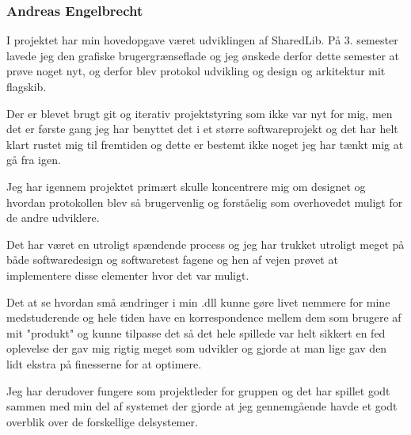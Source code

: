 \subsubsection{Andreas Engelbrecht}
I projektet har min hovedopgave været udviklingen af SharedLib. 
På 3. semester lavede jeg den grafiske brugergrænseflade og jeg ønskede derfor dette semester at prøve noget nyt, og derfor blev protokol udvikling og design og arkitektur mit flagskib.

Der er blevet brugt git og iterativ projektstyring som ikke var nyt for mig, men det er første gang jeg har benyttet det i et større softwareprojekt og det har helt klart rustet mig til fremtiden og dette er bestemt ikke noget jeg har tænkt mig at gå fra igen.

Jeg har igennem projektet primært skulle koncentrere mig om designet og hvordan protokollen blev så brugervenlig og forståelig som overhovedet muligt for de andre udviklere.

Det har været en utroligt spændende process og jeg har trukket utroligt meget på både softwaredesign og softwaretest fagene og hen af vejen prøvet at implementere disse elementer hvor det var muligt. 

Det at se hvordan små ændringer i min .dll kunne gøre livet nemmere for mine medstuderende og hele tiden have en korrespondence mellem dem som brugere af mit "produkt" og kunne tilpasse det så det hele spillede var helt sikkert en fed oplevelse der gav mig rigtig meget som udvikler og gjorde at man lige gav den lidt ekstra på finesserne for at optimere.  

Jeg har derudover fungere som projektleder for gruppen og det har spillet godt sammen med min del af systemet der gjorde at jeg gennemgående havde et godt overblik over de forskellige delsystemer.





